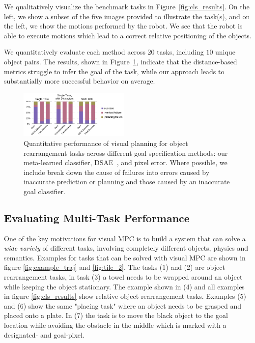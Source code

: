 We qualitatively visualize the benchmark tasks in Figure~\ref{fig:cls_results}.
On the left, we show a subset of the five images provided to illustrate the task(s), and on the left, we show the motions performed by the robot. We see that the robot is able to execute motions which lead to a correct relative positioning of the objects.

We quantitatively evaluate each method across 20 tasks, including $10$ unique object pairs. The results, shown in Figure~\ref{fig:cls_charts}, indicate that the distance-based metrics
struggle to infer the goal of the task, while our approach leads to substantially more successful behavior on average.



\begin{figure}
    \centering
    \includegraphics[width=0.48\textwidth]{images_cls/cls_charts.jpeg}
    \caption{\small Quantitative performance of visual planning for object rearrangement tasks across different goal specification methods: our meta-learned classifier, DSAE~\cite{dsae}, and pixel error. Where possible, we include break down the cause of failures into errors caused by inaccurate prediction or planning and those caused by an inaccurate goal classifier.}
    \label{fig:cls_charts}
    \vspace{-0.3cm}
\end{figure}


\subsection{Evaluating Multi-Task Performance}
\label{subsec:multi_task_bench}
One of the key motivations for visual MPC is to build a system that can solve a \emph{wide variety} of different tasks, involving completely different objects, physics and semantics. Examples for tasks that can be solved with visual MPC are shown in figure \ref{fig:example_traj} and \ref{fig:tile_2}. The tasks (1) and (2) are object rearrangement tasks, in task (3) a towel needs to be wrapped around an object while keeping the object stationary. The example shown in (4) and all examples in figure \ref{fig:cls_results} show relative object rearrangement tasks. Examples (5) and (6) show the same "placing task" where an object needs to be grasped and placed onto a plate. In (7) the task is to move the black object to the goal location while avoiding the obstacle in the middle which is marked with a designated- and goal-pixel.

